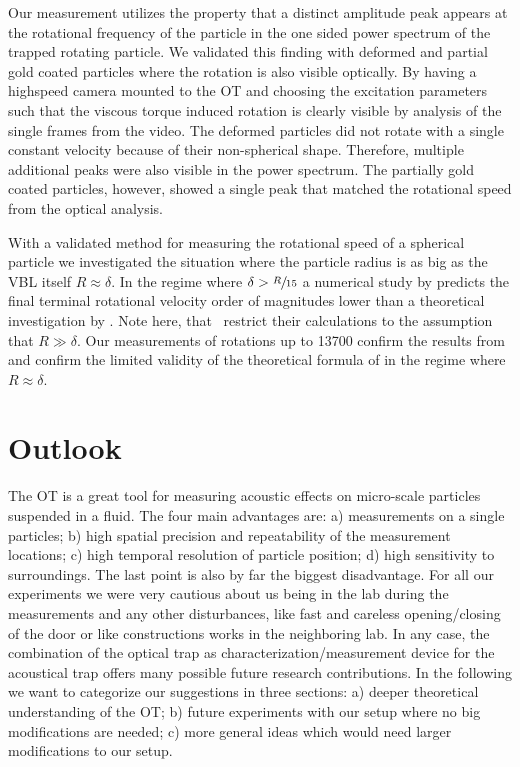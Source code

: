 Our measurement utilizes the property that a distinct amplitude peak appears at 
the rotational frequency of the particle in the one sided power spectrum of the 
trapped rotating particle. We validated this finding with deformed and partial 
gold coated particles where the rotation is also visible optically. By having a 
highspeed camera mounted to the OT and choosing the excitation parameters such 
that the viscous torque induced rotation is clearly visible by analysis of the 
single frames from the video. The deformed particles did not rotate with a 
single constant velocity because of their non-spherical shape. Therefore, 
multiple additional peaks were also visible in the power spectrum. The 
partially gold coated particles, however, showed a single peak that matched the 
rotational speed from the optical analysis.

With a validated method for measuring the rotational speed of a spherical 
particle we investigated the situation where the particle radius is as big as 
the VBL itself $R\approx\delta$. In the regime where $\delta 
> \sfrac{R}{15}$ a numerical study by  predicts the final 
terminal rotational velocity order of magnitudes lower than a theoretical 
investigation by . Note here, that~\cite{Lamprecht2015} 
restrict their calculations to the assumption that $R\gg\delta$. Our 
measurements of rotations up to \SI{13700}{\rpm} confirm the results from 
 and confirm the limited validity of the theoretical formula of 
 in the regime where $R\approx\delta$.

\section{Outlook}

The OT is a great tool for measuring acoustic effects on micro-scale particles 
suspended in a fluid. The four main advantages are: a) measurements on a single 
particles; b) high spatial precision and repeatability of the measurement 
locations; c) high temporal resolution of particle position; d) high 
sensitivity to surroundings. The last point is also by far the biggest 
disadvantage. For all our experiments we were very cautious about us being in 
the lab during the measurements and any other disturbances, like fast and 
careless opening/closing of the door or like constructions works in the 
neighboring lab. In any case, the combination of the optical trap as 
characterization/measurement device for the acoustical trap offers many 
possible future research contributions. In the following we want to categorize 
our suggestions in three sections: a) deeper theoretical understanding of the 
OT; b) future experiments with our setup where no big modifications are needed; 
c) more general ideas which would need larger modifications to our setup.

